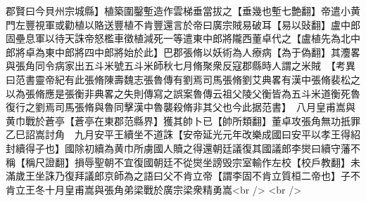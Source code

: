 郡賢曰今貝州宗城縣】植築圍鑿塹造作雲梯垂當拔之【垂幾也塹七艶翻】帝遣小黄門左豐視軍或勸植以賂送豐植不肯豐還言於帝曰廣宗賊易破耳【易以䜴翻】盧中郎固壘息軍以待天誅帝怒檻車徵植減死一等遣東中郎將隴西董卓代之【盧植先為北中郎將卓為東中郎將四中郎將始於此】巴郡張脩以妖術為人療病【為于偽翻】其灋畧與張角同令病家出五斗米號五斗米師秋七月脩聚衆反寇郡縣時人謂之米賊　【考異曰范書靈帝紀有此張脩陳壽魏志張魯傳有劉焉司馬張脩劉艾典畧有漢中張脩裴松之以為張脩應是張衡非典畧之失則傳寫之誤案魯傳云祖父陵父衡皆為五斗米道衡死魯復行之劉焉司馬張脩與魯同擊漢中魯襲殺脩非其父也今此据范書】　八月皇甫嵩與黄巾戰於蒼亭【蒼亭在東郡范縣界】獲其帥卜已【帥所類翻】董卓攻張角無功扺罪乙巳詔嵩討角　九月安平王續坐不道誅【安帝延光元年改樂成國曰安平以孝王得紹封續得子也】國除初續為黄巾所虜國人贖之得還朝廷議復其國議郎李爕曰續守藩不稱【稱尺證翻】損辱聖朝不宜復國朝廷不從爕坐謗毁宗室輸作左校【校戶教翻】未滿歲王坐誅乃復拜議郎京師為之語曰父不肯立帝【謂李固不肯立質桓二帝也】子不肯立王冬十月皇甫嵩與張角弟梁戰於廣宗梁衆精勇嵩<br />
<br />
